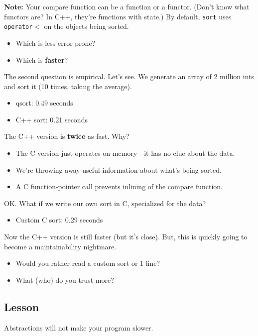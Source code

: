 \documentclass[a4paper]{report}
\begin{document}
{\bf Note:} Your compare function can be a function or a functor. (Don't know what functors
are? In C++, they're functions with state.) By default,
  {\tt sort} uses {\tt operator$<$} on the objects being sorted.

  \begin{itemize}
    \item Which is less error prone?
    \item Which is {\bf faster}?
  \end{itemize}

The second question is empirical. Let's see. We generate an array of 2 million ints
and sort it (10 times, taking the average).

\begin{itemize}
\item qsort: 0.49 seconds
\item C++ sort: 0.21 seconds
\end{itemize}

The C++ version is {\bf twice} as fast. Why?
      \begin{itemize}
        \item The C version just operates on memory---it has no clue about the
          data.
        \item We're throwing away useful information about what's being sorted.
        \item A C function-pointer call prevents inlining of the compare function.
      \end{itemize}
OK. What if we write our own sort in C, specialized for the data?

\begin{itemize}
\item Custom C sort: 0.29 seconds
\end{itemize}

Now the C++ version is still faster (but it's close). But, this is
quickly going to become a maintainability nightmare.
      \begin{itemize}
        \item Would you rather read a custom sort or 1 line?
        \item What (who) do you trust more?
      \end{itemize}

\subsection*{Lesson}
Abstractions will not make your program slower. 
\end{document}
